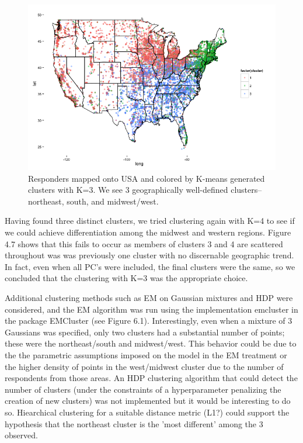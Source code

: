 \documentclass[english]{article}\usepackage{graphicx, color}
\numberwithin{equation}{section}
\numberwithin{figure}{section}
\begin{document}
\begin{figure}
\begin{center}
\includegraphics[scale=.5]{clusters.png}
\end{center}
\caption{Responders mapped onto USA and colored by K-means generated clusters with K=3. We see 3 geographically well-defined clusters--northeast, south, and midwest/west.}
\end{figure}

Having found three distinct clusters, we tried clustering again with K=4 to see if we could achieve differentiation among the midwest and western regions. Figure 4.7 shows that this fails to occur as members of clusters 3 and 4 are scattered throughout was was previously one cluster with no discernable geographic trend. In fact, even when all PC's were included, the final clusters were the same, so we concluded that the clustering with K=3 was the appropriate choice. 

Additional clustering methods such as EM on Gaussian mixtures and HDP were considered, and the EM algorithm was run using the implementation emcluster in the package EMCluster (see Figure 6.1). Interestingly, even when a mixture of 3 Gaussians was specified, only two clusters had a substantial number of points; these were the northeast/south and midwest/west. This behavior could be due to the the parametric assumptions imposed on the model in the EM treatment or the higher density of points in the west/midwest cluster due to the number of respondents from those areas. An HDP clustering algorithm that could detect the number of clusters (under the constraints of a hyperparameter penalizing the creation of new clusters) was not implemented but it would be interesting to do so. Hiearchical clustering for a suitable distance metric (L1?) could support the hypothesis that the northeast cluster is the 'most different' among the 3 observed.
\end{document}
